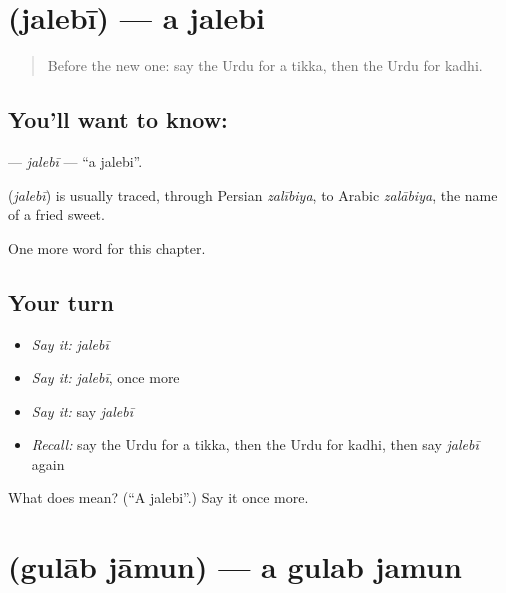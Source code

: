 \section[\texorpdfstring{\ur{جلیبی} (jalebī)}{جلیبی (jalebī)}]{ (jalebī) — a jalebi}

\label{lesson:UR-C260-jalebi}



\begin{quote}
Before the new one: say the Urdu for a tikka, then the Urdu for kadhi.
\end{quote}

\subsection*{You'll want to know: }
\textbf{} — \emph{jalebī} — \textquotedblleft{}a jalebi\textquotedblright{}.

\begin{cousinweb}
\textbf{} (\emph{jalebī}) is usually traced, through Persian \emph{zalībiya}, to Arabic \emph{zalābiya}, the name of a fried sweet.
\end{cousinweb}

\begin{grammarlens}[title={What you've built}]
One more word for this chapter.
\end{grammarlens}

\subsection*{Your turn}
\begin{itemize}
\raggedright
  \item \emph{Say it:} \emph{jalebī}
  \item \emph{Say it:} \emph{jalebī}, once more
  \item \emph{Say it:} say \emph{jalebī}
  \item \emph{Recall:} say the Urdu for a tikka, then the Urdu for kadhi, then say \emph{jalebī} again
\end{itemize}

\begin{tcolorbox}[breakable,colback=teal!4,colframe=teal!35!black,title={Before you move on}]
What does  mean? (\textquotedblleft{}A jalebi\textquotedblright{}.) Say it once more.
\end{tcolorbox}
\section[\texorpdfstring{\ur{گلاب} \ur{جامن} (gulāb jāmun)}{گلاب جامن (gulāb jāmun)}]{  (gulāb jāmun) — a gulab jamun}

